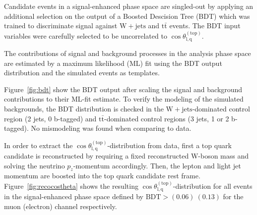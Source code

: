 \documentclass[a4paper]{jpconf}
\newcommand{\wjets}[0]{\mathrm{W+jets}}
\newcommand{\ttbar}[0]{\ensuremath{\mathrm{t\bar{t}}}}
\newcommand{\costheta}[0]{\cos\theta_{\mathrm{l,q}}^{\mathrm{(top)}}}
\newcommand{\BDT}[0]{\ensuremath{\mathrm{BDT}}}
\begin{document}
Candidate events in a signal-enhanced phase space are singled-out by applying an additional selection on the output of a Boosted Descision Tree (BDT) which was trained to discriminate signal against $\wjets$ and $\ttbar$ events. The BDT input variables were carefully selected to be uncorrelated to $\costheta$.


The contributions of signal and background processes in the analysis phase space are estimated by a maximum likelihood (ML) fit using the BDT output distribution and the simulated events as templates.


Figure~\ref{fig:bdt} show the BDT output after scaling the signal and background contributions to their ML-fit estimate. To verify the modeling of the simulated backgrounds, the BDT distribution is checked in the $\wjets$-dominated control region (2 jets, 0 b-tagged) and $\ttbar$-dominated control regions (3 jets, 1 or 2 b-tagged). No mismodeling was found when comparing to data.


In order to extract the $\costheta$-distribution from data, first a top quark candidate is reconstructed by requiring a fixed reconstructed W-boson mass and solving the neutrino $p_{z}$-momentum accordingly. Then, the lepton and light jet momentum are boosted into the top quark candidate rest frame. Figure~\ref{fig:recocostheta} shows the resulting $\costheta$-distribution for all events in the signal-enhanced phase space defined by $\BDT>(0.06)~(0.13)$ for the muon (electron) channel respectively.
\end{document}
